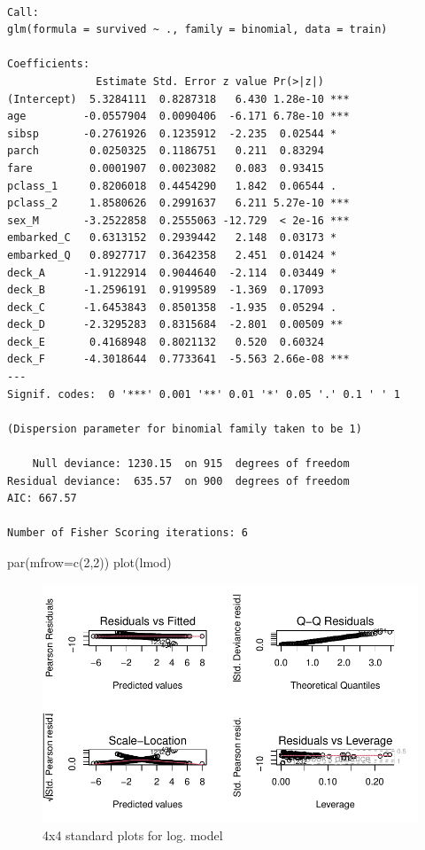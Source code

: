 \documentclass[
  letterpaper,
  DIV=11,
  numbers=noendperiod]{scrartcl}
\newenvironment{Shaded}{\begin{snugshade}}{\end{snugshade}}
\newcommand{\AttributeTok}[1]{\textcolor[rgb]{0.40,0.45,0.13}{#1}}
\newcommand{\DecValTok}[1]{\textcolor[rgb]{0.68,0.00,0.00}{#1}}
\newcommand{\FunctionTok}[1]{\textcolor[rgb]{0.28,0.35,0.67}{#1}}
\newcommand{\NormalTok}[1]{\textcolor[rgb]{0.00,0.23,0.31}{#1}}
\begin{document}
\begin{verbatim}

Call:
glm(formula = survived ~ ., family = binomial, data = train)

Coefficients:
              Estimate Std. Error z value Pr(>|z|)    
(Intercept)  5.3284111  0.8287318   6.430 1.28e-10 ***
age         -0.0557904  0.0090406  -6.171 6.78e-10 ***
sibsp       -0.2761926  0.1235912  -2.235  0.02544 *  
parch        0.0250325  0.1186751   0.211  0.83294    
fare         0.0001907  0.0023082   0.083  0.93415    
pclass_1     0.8206018  0.4454290   1.842  0.06544 .  
pclass_2     1.8580626  0.2991637   6.211 5.27e-10 ***
sex_M       -3.2522858  0.2555063 -12.729  < 2e-16 ***
embarked_C   0.6313152  0.2939442   2.148  0.03173 *  
embarked_Q   0.8927717  0.3642358   2.451  0.01424 *  
deck_A      -1.9122914  0.9044640  -2.114  0.03449 *  
deck_B      -1.2596191  0.9199589  -1.369  0.17093    
deck_C      -1.6453843  0.8501358  -1.935  0.05294 .  
deck_D      -2.3295283  0.8315684  -2.801  0.00509 ** 
deck_E       0.4168948  0.8021132   0.520  0.60324    
deck_F      -4.3018644  0.7733641  -5.563 2.66e-08 ***
---
Signif. codes:  0 '***' 0.001 '**' 0.01 '*' 0.05 '.' 0.1 ' ' 1

(Dispersion parameter for binomial family taken to be 1)

    Null deviance: 1230.15  on 915  degrees of freedom
Residual deviance:  635.57  on 900  degrees of freedom
AIC: 667.57

Number of Fisher Scoring iterations: 6
\end{verbatim}

\begin{Shaded}
\begin{Highlighting}[]
\FunctionTok{par}\NormalTok{(}\AttributeTok{mfrow=}\FunctionTok{c}\NormalTok{(}\DecValTok{2}\NormalTok{,}\DecValTok{2}\NormalTok{))}
\FunctionTok{plot}\NormalTok{(lmod)}
\end{Highlighting}
\end{Shaded}

\begin{figure}[H]

{\centering \includegraphics{FinalProject_files/figure-pdf/unnamed-chunk-21-1.pdf}

}

\caption{4x4 standard plots for log. model}

\end{figure}%
\end{document}
